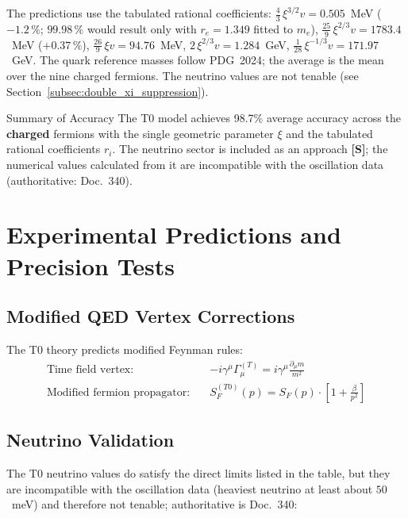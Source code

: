 	The predictions use the tabulated rational coefficients: $\tfrac{4}{3}\,\xi^{3/2}v = 0.505$~MeV ($-1.2\,\%$; $99.98\,\%$ would result only with $r_e = 1.349$ fitted to $m_e$), $\tfrac{25}{9}\,\xi^{2/3}v = 1783.4$~MeV ($+0.37\,\%$), $\tfrac{26}{9}\,\xi v = 94.76$~MeV, $2\,\xi^{2/3}v = 1.284$~GeV, $\tfrac{1}{28}\,\xi^{-1/3}v = 171.97$~GeV. The quark reference masses follow PDG~2024; the average is the mean over the nine charged fermions. The neutrino values are not tenable (see Section~\ref{subsec:double_xi_suppression}).
	
	\begin{keyresult}{Summary of Accuracy}{}
		The T0 model achieves 98.7\% average accuracy across the \textbf{charged} fermions with the single geometric parameter $\xi$ and the tabulated rational coefficients $r_i$. The neutrino sector is included as an approach \textbf{[S]}; the numerical values calculated from it are incompatible with the oscillation data (authoritative: Doc.~340).
	\end{keyresult}
	
	\section{Experimental Predictions and Precision Tests}
	\label{sec:experimental_predictions}

	\subsection{Modified QED Vertex Corrections}
	\label{subsec:qed_corrections}
	
	The T0 theory predicts modified Feynman rules:
	\begin{align}
		\text{Time field vertex:} \quad &-i\gamma^\mu\Gamma_\mu^{(T)} = i\gamma^\mu\frac{\partial_\mu m}{m^2} \\
		\text{Modified fermion propagator:} \quad &S_F^{(T0)}(p) = S_F(p) \cdot \left[1 + \frac{\beta}{p^2}\right]
	\end{align}
	
	\subsection{Neutrino Validation}
	\label{subsec:neutrino_validation}
	
	The T0 neutrino values do satisfy the direct limits listed in the table, but they are incompatible with the oscillation data (heaviest neutrino at least about $50$~meV) and therefore not tenable; authoritative is Doc.~340:
	
